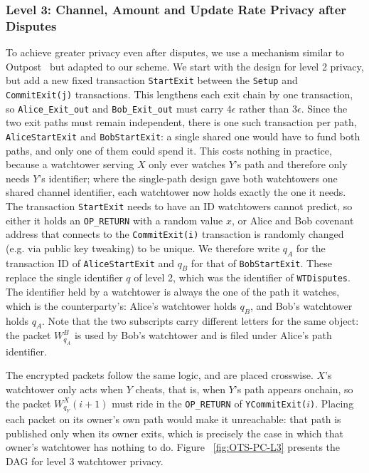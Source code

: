 \documentclass[11pt,a4paper]{article}
\newcommand{\txname}[1]{\texttt{#1}}
\newcommand{\ioname}[1]{\texttt{#1}}
\begin{document}
\subsubsection{Level 3: Channel, Amount and Update Rate Privacy after Disputes}

To achieve greater privacy even after disputes, we use a mechanism similar to Outpost~\cite{outpost} but adapted to our scheme. We start with the design for level 2 privacy, but add a new fixed transaction \txname{StartExit} between the \txname{Setup} and \txname{CommitExit(j)} transactions. This lengthens each exit chain by one transaction, so \ioname{Alice\_Exit\_out} and \ioname{Bob\_Exit\_out} must carry $4\epsilon$ rather than $3\epsilon$. Since the two exit paths must remain independent, there is one such transaction per path, \txname{AliceStartExit} and \txname{BobStartExit}: a single shared one would have to fund both paths, and only one of them could spend it. This costs nothing in practice, because a watchtower serving $X$ only ever watches $Y$'s path and therefore only needs $Y$'s identifier; where the single-path design gave both watchtowers one shared channel identifier, each watchtower now holds exactly the one it needs. The transaction \txname{StartExit} needs to have an ID watchtowers cannot predict, so either it holds an \txname{OP\_RETURN} with a random value $x$, or Alice and Bob covenant address that connects to the \txname{CommitExit(i)} transaction is randomly changed (e.g. via public key tweaking) to be unique. We therefore write $q_A$ for the transaction ID of \txname{AliceStartExit} and $q_B$ for that of \txname{BobStartExit}. These replace the single identifier $q$ of level 2, which was the identifier of \txname{WTDisputes}. The identifier held by a watchtower is always the one of the path it watches, which is the counterparty's: Alice's watchtower holds $q_B$, and Bob's watchtower holds $q_A$. Note that the two subscripts carry different letters for the same object: the packet $W^B_{q_A}$ is used by Bob's watchtower and is filed under Alice's path identifier.

The encrypted packets follow the same logic, and are placed crosswise. $X$'s watchtower only acts when $Y$ cheats, that is, when $Y$'s path appears onchain, so the packet $W^X_{q_Y}(i+1)$ must ride in the \txname{OP\_RETURN} of \txname{YCommitExit($i$)}. Placing each packet on its owner's own path would make it unreachable: that path is published only when its owner exits, which is precisely the case in which that owner's watchtower has nothing to do.
Figure ~\ref{fig:OTS-PC-L3} presents the DAG for level 3 watchtower privacy.
\end{document}
